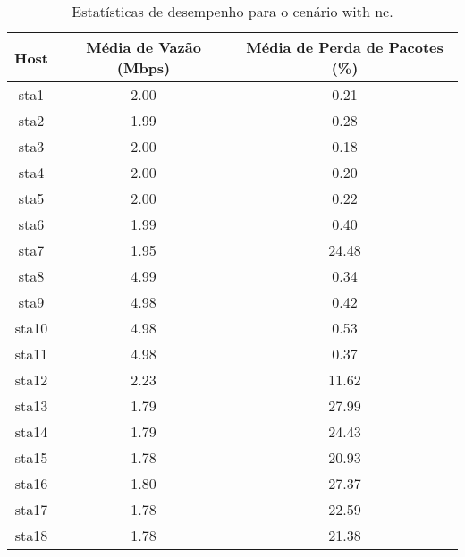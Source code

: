 \begin{table}[htbp]
    \centering
    \label{tab:with_nc_stats}
    \begin{tabular}{|c|c|c|}
        \hline
        \textbf{Host} & \textbf{Média de Vazão (Mbps)} & \textbf{Média de Perda de Pacotes (\%)} \\ \hline
        sta1 & 2.00 & 0.21 \\ \hline
        sta2 & 1.99 & 0.28 \\ \hline
        sta3 & 2.00 & 0.18 \\ \hline
        sta4 & 2.00 & 0.20 \\ \hline
        sta5 & 2.00 & 0.22 \\ \hline
        sta6 & 1.99 & 0.40 \\ \hline
        sta7 & 1.95 & 24.48 \\ \hline
        sta8 & 4.99 & 0.34 \\ \hline
        sta9 & 4.98 & 0.42 \\ \hline
        sta10 & 4.98 & 0.53 \\ \hline
        sta11 & 4.98 & 0.37 \\ \hline
        sta12 & 2.23 & 11.62 \\ \hline
        sta13 & 1.79 & 27.99 \\ \hline
        sta14 & 1.79 & 24.43 \\ \hline
        sta15 & 1.78 & 20.93 \\ \hline
        sta16 & 1.80 & 27.37 \\ \hline
        sta17 & 1.78 & 22.59 \\ \hline
        sta18 & 1.78 & 21.38 \\ \hline
    \end{tabular}
    \caption{Estatísticas de desempenho para o cenário with nc.}
\end{table}

